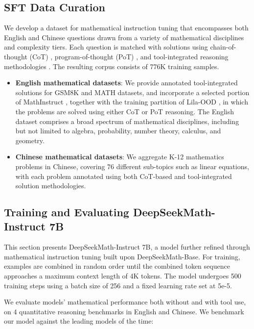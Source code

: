 \begin{itemize}[topsep=0pt]
\subsection{SFT Data Curation}

We develop a dataset for mathematical instruction tuning that encompasses both English and Chinese questions drawn from a variety of mathematical disciplines and complexity tiers. Each question is matched with solutions using chain-of-thought (CoT) \citep{cot}, program-of-thought (PoT) \citep{pot,pal}, and tool-integrated reasoning methodologies \citep{tora}. The resulting corpus consists of 776K training samples.

\begin{itemize}[topsep=0pt]
    \item \textbf{English mathematical datasets}: We provide annotated tool-integrated solutions for GSM8K and MATH datasets, and incorporate a selected portion of MathInstruct \citep{MathInstruct}, together with the training partition of Lila-OOD \citep{lila}, in which the problems are solved using either CoT or PoT reasoning. The English dataset comprises a broad spectrum of mathematical disciplines, including but not limited to algebra, probability, number theory, calculus, and geometry.
    \item \textbf{Chinese mathematical datasets}: We aggregate K-12 mathematics problems in Chinese, covering 76 different sub-topics such as linear equations, with each problem annotated using both CoT-based and tool-integrated solution methodologies.
\end{itemize}

\subsection{Training and Evaluating DeepSeekMath-Instruct 7B}

This section presents DeepSeekMath-Instruct 7B, a model further refined through mathematical instruction tuning built upon DeepSeekMath-Base. For training, examples are combined in random order until the combined token sequence approaches a maximum context length of 4K tokens. The model undergoes 500 training steps using a batch size of 256 and a fixed learning rate set at 5e-5.

We evaluate models' mathematical performance both without and with tool use, on 4 quantitative reasoning benchmarks in English and Chinese. We benchmark our model against the leading models of the time:


\end{itemize}
